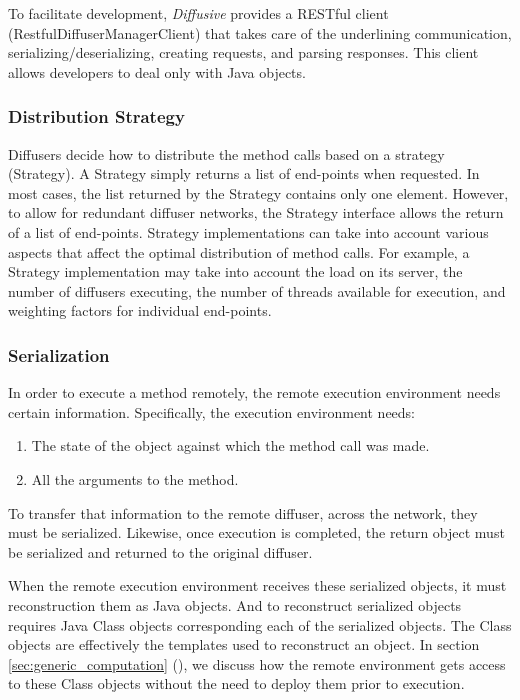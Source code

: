 \documentclass[11pt]{article}
\begin{document}
To facilitate development, \emph{Diffusive} provides a RESTful client (\textsf{RestfulDiffuserManagerClient}) that takes care of the underlining communication, serializing/deserializing, creating requests, and parsing responses. This client allows developers to deal only with Java objects.

\subsubsection{Distribution Strategy\label{sec:distribution_strategy}}
Diffusers decide how to distribute the method calls based on a strategy (\textsf{Strategy}). A \textsf{Strategy} simply returns a list of end-points when requested. In most cases, the list returned by the \textsf{Strategy} contains only one element. However, to allow for redundant diffuser networks, the \textsf{Strategy} interface allows the return of a list of end-points. \textsf{Strategy} implementations can take into account various aspects that affect the optimal distribution of method calls. For example, a \textsf{Strategy} implementation may take into account the load on its server, the number of diffusers executing, the number of threads available for execution, and weighting factors for individual end-points.

\subsubsection{Serialization\label{sec:serialization}}
In order to execute a method remotely, the remote execution environment needs certain information. Specifically, the execution environment needs:
\begin{enumerate}
\item The state of the object against which the method call was made.
\item All the arguments to the method.
\end{enumerate}
To transfer that information to the remote diffuser, across the network, they must be serialized. Likewise, once execution is completed, the return object must be serialized and returned to the original diffuser.

When the remote execution environment receives these serialized objects, it must reconstruction them as Java objects. And to reconstruct serialized objects requires Java \textsf{Class} objects corresponding each of the serialized objects. The \textsf{Class} objects are effectively the templates used to reconstruct an object. In section \ref{sec:generic_computation} (), we discuss how the remote environment gets access to these \textsf{Class} objects without the need to deploy them prior to execution.
\end{document}
